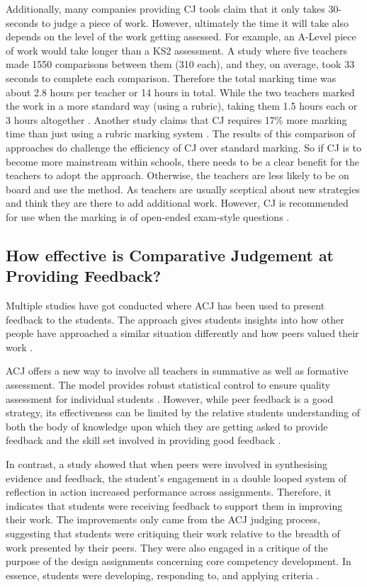 	Additionally, many companies providing CJ tools claim that it only takes  30-seconds to judge a piece of work. However, ultimately the time it will take also depends on the level of the work getting assessed. For example, an A-Level piece of work would take longer than a KS2 assessment. A study where five teachers made 1550 comparisons between them (310 each), and they, on average, took 33 seconds to complete each comparison. Therefore the total marking time was about 2.8 hours per teacher or 14 hours in total. While the two teachers marked the work in a more standard way (using a rubric), taking them 1.5 hours each or 3 hours altogether \cite{mcmahon2015comparative}. Another study claims that CJ requires 17\% more marking time than just using a rubric marking system \cite{steedle2016evaluating}. The results of this comparison of approaches do challenge the efficiency of CJ over standard marking. So if CJ is to become more mainstream within schools, there needs to be a clear benefit for the teachers to adopt the approach. Otherwise, the teachers are less likely to be on board and use the method. As teachers are usually sceptical about new strategies and think they are there to add additional work. However, CJ is recommended for use when the marking is of open-ended exam-style questions \cite{steedle2016evaluating}.
	

	\subsection{How effective is Comparative Judgement at Providing Feedback?} %
	Multiple studies have got conducted where ACJ has been used to present feedback to the students. The approach gives students insights into how other people have approached a similar situation differently and how peers valued their work \cite{seery2012validity}. 
	
	ACJ offers a new way to involve all teachers in summative as well as formative assessment. The model provides robust statistical control to ensure quality assessment for individual students \cite{pollitt2012method}. However, while peer feedback is a good strategy, its effectiveness can be limited by the relative students understanding of both the body of knowledge upon which they are getting asked to provide feedback and the skill set involved in providing good feedback \cite{potter2017compair}.
	
	In contrast, a study showed that when peers were involved in synthesising evidence and feedback, the student's engagement in a double looped system of reflection in action increased performance across assignments. Therefore, it indicates that students were receiving feedback to support them in improving their work. The improvements only came from the ACJ judging process, suggesting that students were critiquing their work relative to the breadth of work presented by their peers. They were also engaged in a critique of the purpose of the design assignments concerning core competency development. In essence, students were developing, responding to, and applying criteria \cite{seery2019integrating}.
	
